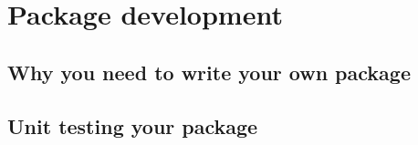 \documentclass[]{gitbook}
\newenvironment{Shaded}{\begin{snugshade}}{\end{snugshade}}
\newcommand{\DecValTok}[1]{\textcolor[rgb]{0.00,0.00,0.81}{#1}}
\newcommand{\NormalTok}[1]{#1}
\newcommand{\OperatorTok}[1]{\textcolor[rgb]{0.81,0.36,0.00}{\textbf{#1}}}
\newcommand{\StringTok}[1]{\textcolor[rgb]{0.31,0.60,0.02}{#1}}
\begin{document}
\begin{Shaded}
\end{Shaded}

\hypertarget{package-development}{%
\section{Package development}\label{package-development}}

\hypertarget{why-you-need-to-write-your-own-package}{%
\subsection{Why you need to write your own package}\label{why-you-need-to-write-your-own-package}}

\hypertarget{unit-testing-your-package}{%
\subsection{Unit testing your package}\label{unit-testing-your-package}}
\end{document}

